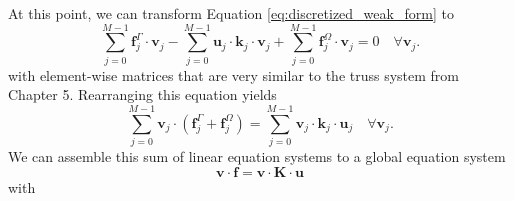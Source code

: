 At this point, we can transform Equation \eqref{eq:discretized_weak_form} to 
\begin{equation}
    \sum_{j=0}^{M-1} \mathbf{f}^\Gamma_j \cdot \mathbf{v}_j
    - \sum_{j=0}^{M-1} \mathbf{u}_j \cdot \mathbf{k}_j \cdot \mathbf{v}_j
    + \sum_{j=0}^{M-1} \mathbf{f}^\Omega_j \cdot \mathbf{v}_j = 0 \quad \forall \mathbf{v}_j.
\end{equation}
with element-wise matrices that are very similar to the truss system from Chapter 5. Rearranging this equation yields 
\begin{equation}
    \sum_{j=0}^{M-1} \mathbf{v}_j \cdot \left( \mathbf{f}^\Gamma_j + \mathbf{f}^\Omega_j \right)
    = \sum_{j=0}^{M-1} \mathbf{v}_j \cdot \mathbf{k}_j \cdot \mathbf{u}_j \quad \forall \mathbf{v}_j.
\end{equation}
We can assemble this sum of linear equation systems to a global equation system 
\begin{equation}
    \mathbf{v} \cdot \mathbf{f} = \mathbf{v} \cdot \mathbf{K} \cdot \mathbf{u}
\end{equation}
with 
